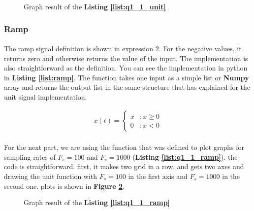 
\begin{figure}[H]
  \scalebox{0.6}{}
  \caption{Graph result of the \textbf{Listing \ref{list:q1_1_unit}}}
  \label{fig:Q1-1-unit}
\end{figure}

\subsubsection{Ramp}
\paragraph{}The ramp signal definition is shown in expression
 2. For the negative values, it returns zero and otherwise 
 returns the value of the input. The implementation is also 
 straightforward as the definition. You can see the 
 implementation in python in \textbf{Listing \ref{list:ramp}}. 
 The function takes one input as a simple list or 
 \textbf{Numpy} array and returns the output list in the same 
 structure that has explained for the unit signal implementation.   

\begin{align}
  x(t) = \begin{cases}
   x &: x\geq 0\\
   0 &: x< 0\end{cases}
 \end{align}

\paragraph{}For the next part, we are using the function that was defined to 
plot graphs for sampling rates of  $F_s=100$ and 
$F_s=1000$ (\textbf{Listing \ref{list:q1_1_ramp}}). the code is 
straightforward. first, it makes two grid in a row, and gets 
two axes and drawing the unit function with $F_s=100$ in the 
first axis and $F_s=1000$ in the second one. plots is shown in \textbf{Figure \ref{fig:Q1-1-ramp}}.

\begin{figure}[H]
  \scalebox{0.6}{}
  \caption{Graph result of the \textbf{Listing \ref{list:q1_1_ramp}}}
  \label{fig:Q1-1-ramp}
\end{figure}

